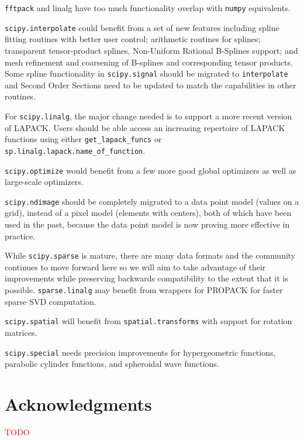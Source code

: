 \documentclass[fleqn,10pt]{wlscirep}
\newcommand{\fixme}[1]{\textcolor{red}{{#1}}}
\begin{document}
\texttt{fftpack} and {linalg} have too much functionality overlap with
\texttt{numpy} equivalents.

\texttt{scipy.interpolate} could benefit from a set of new features including
spline fitting routines with better user control; arithmetic routines for
splines; transparent tensor-product splines, Non-Uniform Rational B-Splines
support; and mesh refinement and coarsening of B-splines and corresponding
tensor products.  Some spline functionality in \texttt{scipy.signal} should be
migrated to \texttt{interpolate} and Second Order Sections need to be updated
to match the capabilities in other routines.

For \texttt{scipy.linalg}, the major change needed is to support a more recent
version of LAPACK. Users should be able access an increasing repertoire of
LAPACK functions using either \texttt{get\_lapack\_funcs} or
\texttt{sp.linalg.lapack.name\_of\_function}.

\texttt{scipy.optimize} would benefit from a few more good global optimizers 
as well as large-scale optimizers.

\texttt{scipy.ndimage} should be completely migrated to a data point
model (values on a grid), instead of a pixel model (elements with centers),
both of which have been used in the past, because the data point model is now
proving more effective in practice.

While \texttt{scipy.sparse} is mature, there are many data
formats and the community continues to move forward here so we will aim
to take advantage of their improvements\cite{abbasi2018sparse} 
while preserving backwards compatibility to the extent that it is possible.
\texttt{sparse.linalg} may benefit from wrappers for PROPACK 
for faster sparse SVD computation.

\texttt{scipy.spatial} will benefit from \texttt{spatial.transforms} with
support for rotation matrices.

\texttt{scipy.special} needs precision improvements for hypergeometric 
functions, parabolic cylinder functions, and spheroidal wave functions.



\section*{Acknowledgments}

\fixme{TODO}

\end{document}
